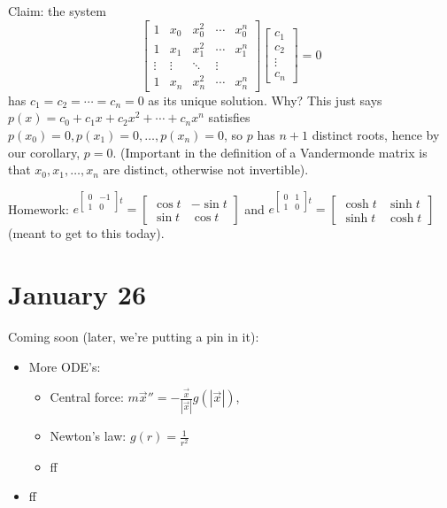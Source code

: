\documentclass{article}
\theoremstyle{plain}
\theoremstyle{remark}
\begin{document}
Claim: the system
\[
	\begin{bmatrix} 1 & x_0 & x_0^2 & \cdots & x_0^n\\
		1 & x_1 & x_1^2 & \cdots & x_1^n \\
		\vdots & \vdots & \ddots & \vdots\\
	1 & x_n & x_n^2 & \cdots & x_n^n\end{bmatrix}
	\begin{bmatrix} c_1 \\ c_2 \\ \vdots \\ c_n \end{bmatrix} = 0
\]
has $c_1 = c_2 = \cdots = c_n = 0$ as its unique solution.
Why? This just says $p(x) = c_0 + c_1x + c_2x^2 + \cdots + c_nx^n$
satisfies $p(x_0) = 0, p(x_1) = 0, \dots, p(x_n) = 0$,
so $p$ has $n+1$ distinct roots,
hence by our corollary, $p = 0$.
(Important in the definition of a Vandermonde matrix is that
$x_0,x_1,\dots,x_n$ are distinct, otherwise not invertible).

Homework: $e^{\begin{bmatrix}0 & -1 \\ 1 & 0 \end{bmatrix}t}
= \begin{bmatrix} \cos{t} & -\sin{t} \\ \sin{t} & \cos{t}\end{bmatrix}$
and $e^{\begin{bmatrix}0 & 1 \\ 1 & 0 \end{bmatrix}t}
= \begin{bmatrix} \cosh{t} & \sinh{t} \\ \sinh{t} & \cosh{t}\end{bmatrix}$
(meant to get to this today).

\section{January 26}
Coming soon (later, we're putting a pin in it):
\begin{itemize}
	\item More ODE's:
		\begin{itemize}
			\item Central force: $m\vec{x}'' = -\frac{\vec{x}}{|\vec{x}|}
				g(|\vec{x}|)$,
			\item Newton's law: $g(r) = \frac{1}{r^2}$
			\item ff
		\end{itemize}
	\item ff
\end{itemize}
\end{document}
